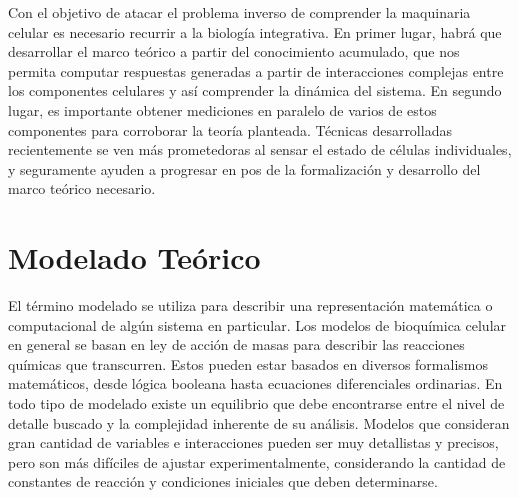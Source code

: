 




Con el objetivo de atacar el problema inverso de comprender la maquinaria celular es necesario recurrir a la biología integrativa. En primer lugar, habrá que desarrollar el marco teórico a partir del conocimiento acumulado, que nos permita computar respuestas generadas a partir de interacciones complejas entre los componentes celulares y así comprender la dinámica del sistema. En segundo lugar, es importante obtener mediciones en paralelo de varios de estos componentes para corroborar la teoría planteada\cite{Brenner1995}. Técnicas desarrolladas recientemente se ven más prometedoras al sensar el estado de células individuales, y seguramente ayuden a progresar en pos de la formalización y desarrollo del marco teórico necesario\cite{Cardelli2007}.


\section{Modelado Teórico}

El término modelado se utiliza para describir una representación matemática o computacional de algún sistema en particular. Los modelos de bioquímica celular en general se basan en ley de acción de masas para describir las reacciones químicas que transcurren. Estos pueden estar basados en diversos formalismos matemáticos, desde lógica booleana hasta ecuaciones diferenciales ordinarias. En todo tipo de modelado existe un equilibrio que debe encontrarse entre el nivel de detalle buscado y la complejidad inherente de su análisis. Modelos que consideran gran cantidad de variables e interacciones pueden ser muy detallistas y precisos, pero son más difíciles de ajustar experimentalmente, considerando la cantidad de constantes de reacción y condiciones iniciales que deben determinarse\cite{Spencer2011}. 


